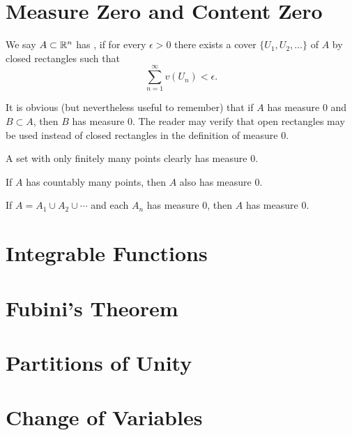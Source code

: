 \section{Measure Zero and Content Zero}
\begin{definition}
We say $A\subset\mathbb R^n$ has , if for every $\epsilon>0$ there exists a cover $\{U_1,U_2,\dots\}$ of $A$ by closed rectangles such that
\[\sum_{n=1}^{\infty}v(U_n)<\epsilon.\]
\end{definition}

It is obvious (but nevertheless useful to remember) that if $A$ has measure $0$ and $B\subset A$, then $B$ has measure $0$. 
The reader may verify that open rectangles may be used instead of closed rectangles in the definition of measure $0$.

\begin{example}
A set with only finitely many points clearly has measure $0$.
\end{example}

\begin{lemma}
If $A$ has countably many points, then $A$ also has measure $0$.
\end{lemma}

\begin{lemma}
If $A=A_1\cup A_2\cup\cdots$ and each $A_n$ has measure $0$, then $A$ has measure $0$.
\end{lemma}

\begin{definition}

\end{definition}

\section{Integrable Functions}
\section{Fubini's Theorem}
\section{Partitions of Unity}
\section{Change of Variables}